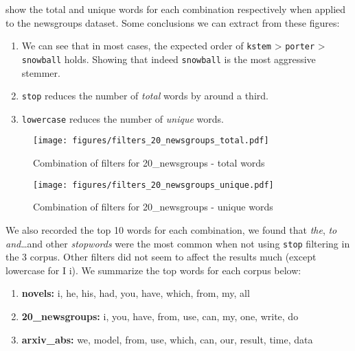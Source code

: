  show the total and unique words for each combination
respectively when applied to the newsgroups dataset. Some conclusions we can extract from these figures:
\begin{enumerate}
    \item We can see that in most cases, the expected order of \texttt{kstem} > \texttt{porter} > \texttt{snowball} holds.
    Showing that indeed \texttt{snowball} is the most aggressive stemmer.
    \item \texttt{stop} reduces the number of \emph{total} words by around a third.
    \item \texttt{lowercase} reduces the number of \emph{unique} words.
\end{enumerate}

\begin{figure}[ht]
    \centering\texttt{[image: figures/filters\_20\_newsgroups\_total.pdf]}
    \caption{Combination of filters for 20\_newsgroups - total words}
    \label{fig:stem_news_total}
\end{figure}

\begin{figure}[hb]
    \centering\texttt{[image: figures/filters\_20\_newsgroups\_unique.pdf]}
    \caption{Combination of filters for 20\_newsgroups - unique words}
    \label{fig:stem_news_unique}
\end{figure}


We also recorded the top 10 words for each combination, we found that \emph{the}, \emph{to} \emph{and}\dots and other
\emph{stopwords} were
the most common when not using \texttt{stop} filtering in the 3 corpus. Other filters did not seem to affect the
results much (except lowercase for I \textrightarrow i). We summarize the top words for each corpus below:

\begin{enumerate}
\item \textbf{novels:} i, he, his, had, you, have, which, from, my, all
\item \textbf{20\_newsgroups:} i, you, have, from, use, can, my, one, write, do
\item \textbf{arxiv\_abs:} we, model, from, use, which, can, our, result, time, data
\end{enumerate}

